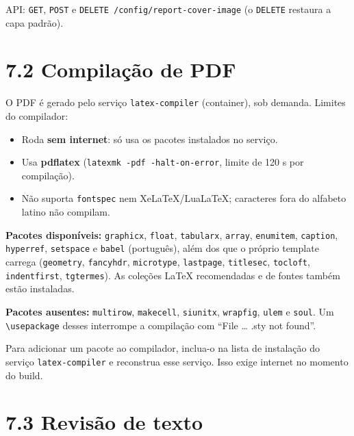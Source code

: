 \documentclass[
  brazilian,
  a4paper,12pt,oneside]{report}
\providecommand{\tightlist}{%
  \setlength{\itemsep}{0pt}\setlength{\parskip}{0pt}}
\begin{document}
API: \texttt{GET}, \texttt{POST} e
\texttt{DELETE\ /}\allowbreak{}\texttt{config/}\allowbreak{}\texttt{report-}\allowbreak{}\texttt{cover-}\allowbreak{}\texttt{image}
(o \texttt{DELETE} restaura a capa padrão).

\section{7.2 Compilação de PDF}\label{compilauxe7uxe3o-de-pdf}

O PDF é gerado pelo serviço
\texttt{latex-}\allowbreak{}\texttt{compiler} (container), sob demanda.
Limites do compilador:

\begin{itemize}
\tightlist
\item
  Roda \textbf{sem internet}: só usa os pacotes instalados no serviço.
\item
  Usa \textbf{pdflatex}
  (\texttt{latexmk\ -}\allowbreak{}\texttt{pdf\ -}\allowbreak{}\texttt{halt-}\allowbreak{}\texttt{on-}\allowbreak{}\texttt{error},
  limite de 120 s por compilação).
\item
  Não suporta \texttt{fontspec} nem XeLaTeX/LuaLaTeX; caracteres fora do
  alfabeto latino não compilam.
\end{itemize}

\textbf{Pacotes disponíveis:} \texttt{graphicx}, \texttt{float},
\texttt{tabularx}, \texttt{array}, \texttt{enumitem}, \texttt{caption},
\texttt{hyperref}, \texttt{setspace} e \texttt{babel} (português), além
dos que o próprio template carrega (\texttt{geometry},
\texttt{fancyhdr}, \texttt{microtype}, \texttt{lastpage},
\texttt{titlesec}, \texttt{tocloft}, \texttt{indentfirst},
\texttt{tgtermes}). As coleções LaTeX recomendadas e de fontes também
estão instaladas.

\textbf{Pacotes ausentes:} \texttt{multirow}, \texttt{makecell},
\texttt{siunitx}, \texttt{wrapfig}, \texttt{ulem} e \texttt{soul}. Um
\texttt{\textbackslash{}usepackage} desses interrompe a compilação com
``File \ldots{} .sty not found''.

Para adicionar um pacote ao compilador, inclua-o na lista de instalação
do serviço \texttt{latex-}\allowbreak{}\texttt{compiler} e reconstrua
esse serviço. Isso exige internet no momento do build.

\section{7.3 Revisão de texto}\label{revisuxe3o-de-texto}
\end{document}
